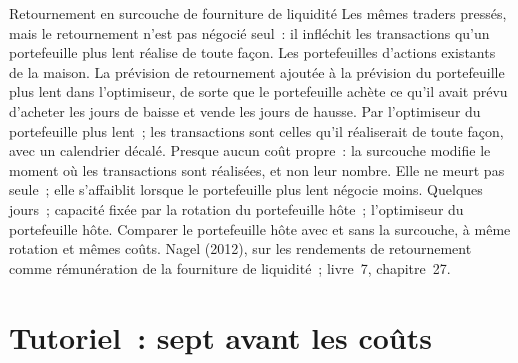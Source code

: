 \begin{strategyfile}{Retournement en surcouche de fourniture de liquidité}\label{strat:s1:short-term-reversal:overlay}
 Les mêmes traders pressés, mais le retournement n'est pas négocié seul~: il infléchit les transactions qu'un portefeuille plus lent réalise de toute façon.
 Les portefeuilles d'actions existants de la maison.
 La prévision de retournement ajoutée à la prévision du portefeuille plus lent dans l'optimiseur, de sorte que le portefeuille achète ce qu'il avait prévu d'acheter les jours de baisse et vende les
jours de hausse.
 Par l'optimiseur du portefeuille plus lent~; les transactions sont celles qu'il réaliserait de toute façon, avec un calendrier décalé.
 Presque aucun coût propre~: la surcouche modifie le moment où les transactions sont réalisées, et non leur nombre.
 Elle ne meurt pas seule~; elle s'affaiblit lorsque le portefeuille plus lent négocie moins.
 Quelques jours~; capacité fixée par la rotation du portefeuille hôte~; l'optimiseur du portefeuille hôte.
 Comparer le portefeuille hôte avec et sans la surcouche, à même rotation et mêmes coûts.
 Nagel (2012), sur les rendements de retournement comme rémunération de la fourniture de liquidité~; livre~7, chapitre~27.
\end{strategyfile}

\section{Tutoriel~: sept avant les coûts}\label{tut:s1:short-term-reversal:tut}

